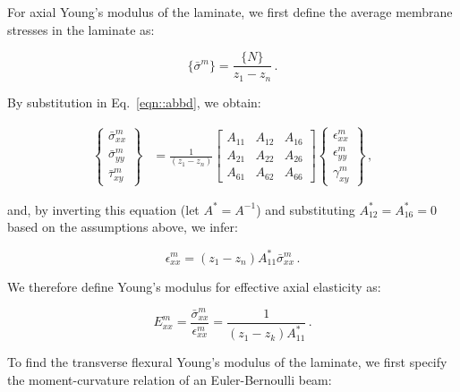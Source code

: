 \documentclass[twocolumn, linenumbers, superscriptaddress, nofootinbib]{revtex4-1}
\begin{document}
				For axial Young's modulus of the laminate, we first define the average membrane stresses in the laminate as:
				
				\begin{equation}
					\{\bar{\sigma}^m\} = \frac{\{N\}}{z_1 - z_n}\,.
				\end{equation}
				
				By substitution in Eq.~\ref{eqn::abbd}, we obtain:
				
				\begin{equation}
					\begin{aligned}
						\begin{Bmatrix}
							\bar{\sigma}^m_{xx} \\
							\bar{\sigma}^m_{yy} \\
							\bar{\tau}^m_{xy}
						\end{Bmatrix}
						& = \frac{1}{(z_1 - z_n)}
						\begin{bmatrix}
							A_{11} & A_{12} & A_{16} \\
							A_{21} & A_{22} & A_{26} \\
							A_{61} & A_{62} & A_{66}
						\end{bmatrix}
						\begin{Bmatrix}
							\epsilon^m_{xx} \\
							\epsilon^m_{yy} \\
							\gamma^m_{xy}
						\end{Bmatrix}\,,
					\end{aligned}
				\end{equation}
				
				and, by inverting this equation (let $A^* = A^{-1}$) and substituting $A^*_{12} = A^*_{16} = 0$ based on the assumptions above, we infer:
				
				\begin{equation}
					\epsilon^m_{xx} = (z_1 - z_n)A^{*}_{11}\bar{\sigma}^m_{xx}\,.
				\end{equation}
				
				We therefore define Young's modulus for effective axial elasticity as:
				
				\begin{equation}
					E^m_{xx} = \frac{\bar{\sigma}^m_{xx}}{\epsilon^m_{xx}} = \frac{1}{(z_1 - z_k)A^*_{11}}\,.
				\end{equation}
				
				To find the transverse flexural Young's modulus of the laminate, we first specify the moment-curvature relation of an Euler-Bernoulli beam:
				
\end{document}
